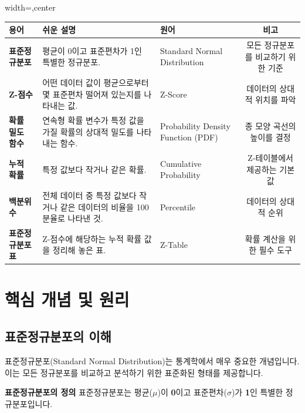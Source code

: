 \documentclass[11pt,a4paper]{book}
\providecommand{\newsection}{\section}
\theoremstyle{definition}
\begin{document}
\begin{adjustbox}{width=\textwidth,center}
\begin{tabular}{lllc}
\toprule
\textbf{용어} & \textbf{쉬운 설명} & \textbf{원어} & \textbf{비고} \\
\midrule
\textbf{표준정규분포} & 평균이 0이고 표준편차가 1인 특별한 정규분포. & Standard Normal Distribution & 모든 정규분포를 비교하기 위한 기준 \\
\textbf{Z-점수} & 어떤 데이터 값이 평균으로부터 몇 표준편차 떨어져 있는지를 나타내는 값. & Z-Score & 데이터의 상대적 위치를 파악 \\
\textbf{확률 밀도 함수} & 연속형 확률 변수가 특정 값을 가질 확률의 상대적 밀도를 나타내는 함수. & Probability Density Function (PDF) & 종 모양 곡선의 높이를 결정 \\
\textbf{누적 확률} & 특정 값보다 작거나 같은 확률. & Cumulative Probability & Z-테이블에서 제공하는 기본 값 \\
\textbf{백분위수} & 전체 데이터 중 특정 값보다 작거나 같은 데이터의 비율을 100분율로 나타낸 것. & Percentile & 데이터의 상대적 순위 \\
\textbf{표준정규분포표} & Z-점수에 해당하는 누적 확률 값을 정리해 놓은 표. & Z-Table & 확률 계산을 위한 필수 도구 \\
\bottomrule
\end{tabular}
\end{adjustbox}

\newsection*{핵심 개념 및 원리}

\subsection{표준정규분포의 이해}
표준정규분포(Standard Normal Distribution)는 통계학에서 매우 중요한 개념입니다. 이는 모든 정규분포를 비교하고 분석하기 위한 표준화된 형태를 제공합니다.

\begin{definitionbox}
\textbf{표준정규분포의 정의}
표준정규분포는 평균($\mu$)이 \textbf{0}이고 표준편차($\sigma$)가 \textbf{1}인 특별한 정규분포입니다.
\end{definitionbox}
\end{document}
